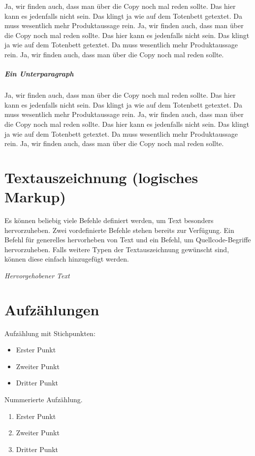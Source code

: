 Ja, wir finden auch, dass man über die Copy noch mal reden sollte. Das hier kann es jedenfalls nicht sein. Das klingt ja wie auf dem Totenbett getextet. Da muss wesentlich mehr Produktaussage rein. Ja, wir finden auch, dass man über die Copy noch mal reden sollte. Das hier kann es jedenfalls nicht sein. Das klingt ja wie auf dem Totenbett getextet. Da muss wesentlich mehr Produktaussage rein. Ja, wir finden auch, dass man über die Copy noch mal reden sollte.

\subparagraph{Ein Unterparagraph}

Ja, wir finden auch, dass man über die Copy noch mal reden sollte. Das hier kann es jedenfalls nicht sein. Das klingt ja wie auf dem Totenbett getextet. Da muss wesentlich mehr Produktaussage rein. Ja, wir finden auch, dass man über die Copy noch mal reden sollte. Das hier kann es jedenfalls nicht sein. Das klingt ja wie auf dem Totenbett getextet. Da muss wesentlich mehr Produktaussage rein. Ja, wir finden auch, dass man über die Copy noch mal reden sollte.

\section{Textauszeichnung (logisches Markup)}

Es können beliebig viele Befehle definiert werden, um Text besonders hervorzuheben. Zwei vordefinierte Befehle stehen bereits zur Verfügung. Ein Befehl für generelles hervorheben von Text und ein Befehl, um Quellcode-Begriffe hervorzuheben. Falls weitere Typen der Textauszeichnung gewünscht sind, können diese einfach hinzugefügt werden.

\emph{Hervorgehobener Text}


\section{Aufzählungen}

Aufzählung mit Stichpunkten:

\begin{itemize}
	\item Erster Punkt
	\item Zweiter Punkt
	\item Dritter Punkt
\end{itemize}

Nummerierte Aufzählung.

\begin{enumerate}
	\item Erster Punkt
	\item Zweiter Punkt
	\item Dritter Punkt
\end{enumerate}

